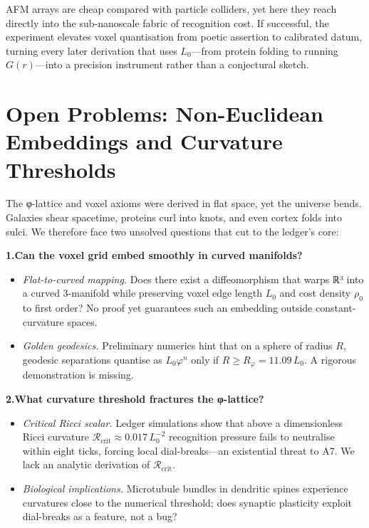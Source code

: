 \documentclass[11pt,oneside]{book}
\begin{document}
AFM arrays are cheap compared with particle colliders, yet here they
reach directly into the sub-nanoscale fabric of recognition cost.  
If successful, the experiment elevates voxel quantisation from poetic
assertion to calibrated datum, turning every later derivation that uses
$L_{0}$—from protein folding to running \(G(r)\)—into a precision instrument
rather than a conjectural sketch.

\section{Open Problems: Non-Euclidean Embeddings and Curvature Thresholds}
\label{sec:open-problems-embeddings}

The φ-lattice and voxel axioms were derived in flat space, yet the universe bends.  
Galaxies shear spacetime, proteins curl into knots, and even cortex folds into sulci.  
We therefore face two unsolved questions that cut to the ledger’s core:

\bigskip
\noindent\textbf{1.\;Can the voxel grid embed smoothly in curved manifolds?}  

\begin{itemize}
\item \emph{Flat-to-curved mapping.}  Does there exist a diffeomorphism that warps ℝ³ into a curved 3-manifold while preserving voxel edge length $L_{0}$ and cost density $\rho_{0}$ to first order?  
  No proof yet guarantees such an embedding outside constant-curvature spaces.
\item \emph{Golden geodesics.}  Preliminary numerics hint that on a sphere of radius $R$, geodesic separations quantise as $L_{0}\varphi^{n}$ only if $R\ge R_{\varphi}=11.09\,L_{0}$.  
  A rigorous demonstration is missing.
\end{itemize}

\medskip
\noindent\textbf{2.\;What curvature threshold fractures the φ-lattice?}  

\begin{itemize}
\item \emph{Critical Ricci scalar.}  Ledger simulations show that above a dimensionless Ricci curvature
  $\mathcal R_{\text{crit}}\approx0.017\,L_{0}^{-2}$  
  recognition pressure fails to neutralise within eight ticks, forcing local dial-breaks—an existential threat to A7.  
  We lack an analytic derivation of $\mathcal R_{\text{crit}}$.
\item \emph{Biological implications.}  Microtubule bundles in dendritic spines experience curvatures close to the numerical threshold; does synaptic plasticity exploit dial-breaks as a feature, not a bug?
\end{itemize}
\end{document}
